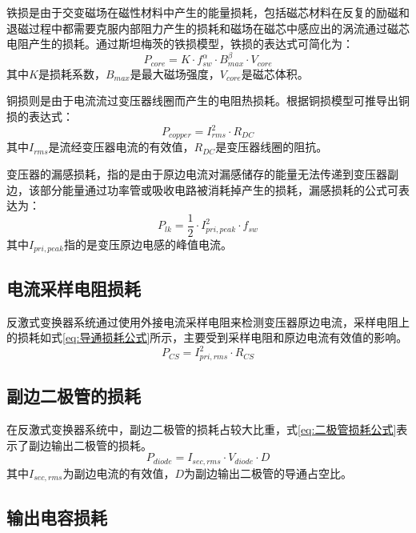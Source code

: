 铁损是由于交变磁场在磁性材料中产生的能量损耗，包括磁芯材料在反复的励磁和退磁过程中都需要克服内部阻力产生的损耗和磁场在磁芯中感应出的涡流通过磁芯电阻产生的损耗。通过斯坦梅茨的铁损模型，铁损的表达式可简化为：
\begin{equation}
    \label{eq:铁损公式}
    P_{core} = K \cdot f_{sw}^\alpha  \cdot B_{max}^\beta \cdot V_{core} 
\end{equation}
其中$K$是损耗系数，$B_{max}$是最大磁场强度，$V_{core}$是磁芯体积。

铜损则是由于电流流过变压器线圈而产生的电阻热损耗。根据铜损模型可推导出铜损的表达式：
\begin{equation}
    \label{eq:铜损公式}
    P_{copper} = I_{rms}^2  \cdot R_{DC} 
\end{equation}
其中$I_{rms}$是流经变压器电流的有效值，$R_{DC}$是变压器线圈的阻抗。

变压器的漏感损耗，指的是由于原边电流对漏感储存的能量无法传递到变压器副边，该部分能量通过功率管或吸收电路被消耗掉产生的损耗，漏感损耗的公式可表达为：
\begin{equation}
    \label{eq:漏感损耗公式}
    P_{lk} = \frac{1}{2}\cdot I_{pri,peak}^2  \cdot f_{sw} 
\end{equation}
其中$I_{pri,peak}$指的是变压原边电感的峰值电流。

\subsection{电流采样电阻损耗}

反激式变换器系统通过使用外接电流采样电阻来检测变压器原边电流，采样电阻上的损耗如式\eqref{eq:导通损耗公式}所示，主要受到采样电阻和原边电流有效值的影响。
\begin{equation}
    \label{eq:采样电阻损耗公式}
    P_{CS} = I_{pri,rms}^2  \cdot R_{CS} 
\end{equation}


\subsection{副边二极管的损耗}

在反激式变换器系统中，副边二极管的损耗占较大比重，式\eqref{eq:二极管损耗公式}表示了副边输出二极管的损耗。
\begin{equation}
    \label{eq:二极管损耗公式}
    P_{diode} = I_{sec,rms} \cdot V_{diode} \cdot D 
\end{equation}
其中$I_{sec,rms}$为副边电流的有效值，$D$为副边输出二极管的导通占空比。

\subsection{输出电容损耗}

